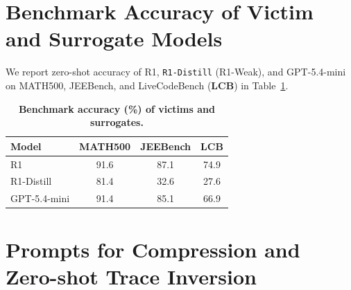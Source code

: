 \section{Benchmark Accuracy
of Victim and Surrogate Models}
\label{app:bench}

We report zero-shot accuracy of R1, \texttt{R1-Distill} (R1-Weak), and GPT-5.4-mini on MATH500, JEEBench, and LiveCodeBench (\textbf{LCB}) in Table~\ref{tab:benchmark_results}.

\begin{table}[h]
  \centering
  \caption{\textbf{Benchmark accuracy (\%) of victims and surrogates.} }
  \label{tab:benchmark_results}
  \small
  \setlength{\tabcolsep}{8.5pt}
  \begin{tabular}{lccc}
    \toprule
    \textbf{Model} & \textbf{MATH500} & \textbf{JEEBench} & \textbf{LCB} \\
    \midrule
    R1          & 91.6 & 87.1 & 74.9 \\
    R1-Distill  & 81.4 & 32.6 & 27.6 \\
    GPT-5.4-mini  & 91.4 & 85.1 & 66.9 \\
    \bottomrule
  \end{tabular}
  \vskip -0.1in
\end{table}


\section{Prompts for Compression and Zero-shot Trace Inversion}

